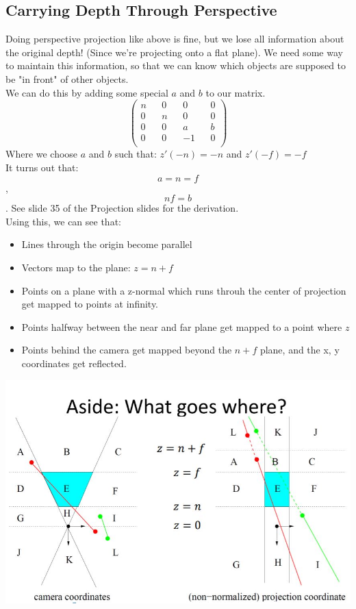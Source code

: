 \documentclass[12pt]{article}
\theoremstyle{definition}
\begin{document}
\subsection{Carrying Depth Through Perspective}
Doing perspective projection like above is fine, but we lose all information about the original depth! (Since we're projecting onto a flat plane). We need some way to maintain this information, so that we can know which objects are supposed to be "in front" of other objects.
\\ \linebreak
We can do this by adding some special $a$ and $b$ to our matrix. 
$$\begin{pmatrix}
n && 0 && 0 && 0 \\
0 && n && 0 && 0 \\
0 && 0 && a && b \\
0 && 0 && -1 && 0 \\
\end{pmatrix}$$
Where we choose $a$ and $b$ such that: $z'(-n) = -n$ and $z'(-f) = -f$ \\ \linebreak
It turns out that:
$$a = n =f $$, 
$$nf = b$$.
See slide 35 of the Projection slides for the derivation.
\\ \linebreak
Using this, we can see that:
\begin{itemize}
	\item Lines through the origin become parallel
	\item Vectors map to the plane: $z = n + f$ 
	\item Points on a plane with a z-normal which runs throuh the center of projection get mapped to points at infinity.
	\item Points halfway between the near and far plane get mapped to a point where $z$ 
	\item  Points behind the camera get mapped beyond the $n + f$ plane, and the x, y coordinates get reflected.
	
\end{itemize}
\includegraphics{what_goes_where}
\end{document}
